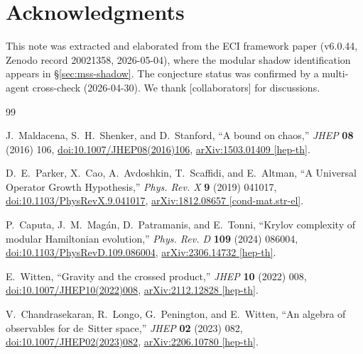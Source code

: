 \documentclass[12pt,a4paper]{article}
\begin{document}
\section*{Acknowledgments}

This note was extracted and elaborated from the ECI framework paper
(v6.0.44, Zenodo record 20021358, 2026-05-04), where the modular
shadow identification appears in \S\ref{sec:mss-shadow}.
The conjecture status was confirmed by a multi-agent cross-check
(2026-04-30).
We thank [collaborators] for discussions.

\begin{thebibliography}{99}

J.~Maldacena, S.~H.~Shenker, and D.~Stanford,
``A bound on chaos,''
\textit{JHEP} \textbf{08} (2016) 106,
\href{https://doi.org/10.1007/JHEP08(2016)106}{doi:10.1007/JHEP08(2016)106},
\href{https://arxiv.org/abs/1503.01409}{arXiv:1503.01409 [hep-th]}.

D.~E.~Parker, X.~Cao, A.~Avdoshkin, T.~Scaffidi, and E.~Altman,
``A Universal Operator Growth Hypothesis,''
\textit{Phys. Rev. X} \textbf{9} (2019) 041017,
\href{https://doi.org/10.1103/PhysRevX.9.041017}{doi:10.1103/PhysRevX.9.041017},
\href{https://arxiv.org/abs/1812.08657}{arXiv:1812.08657 [cond-mat.str-el]}.

P.~Caputa, J.~M.~Mag\'{a}n, D.~Patramanis, and E.~Tonni,
``Krylov complexity of modular Hamiltonian evolution,''
\textit{Phys. Rev. D} \textbf{109} (2024) 086004,
\href{https://doi.org/10.1103/PhysRevD.109.086004}{doi:10.1103/PhysRevD.109.086004},
\href{https://arxiv.org/abs/2306.14732}{arXiv:2306.14732 [hep-th]}.

E.~Witten,
``Gravity and the crossed product,''
\textit{JHEP} \textbf{10} (2022) 008,
\href{https://doi.org/10.1007/JHEP10(2022)008}{doi:10.1007/JHEP10(2022)008},
\href{https://arxiv.org/abs/2112.12828}{arXiv:2112.12828 [hep-th]}.

V.~Chandrasekaran, R.~Longo, G.~Penington, and E.~Witten,
``An algebra of observables for de~Sitter space,''
\textit{JHEP} \textbf{02} (2023) 082,
\href{https://doi.org/10.1007/JHEP02(2023)082}{doi:10.1007/JHEP02(2023)082},
\href{https://arxiv.org/abs/2206.10780}{arXiv:2206.10780 [hep-th]}.


\end{thebibliography}
\end{document}
